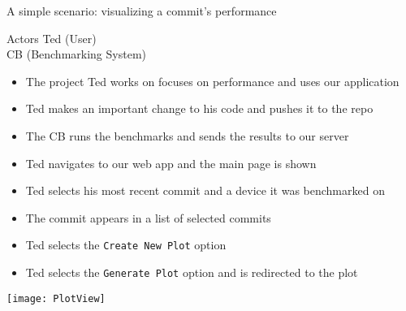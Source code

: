 \begin{frame}{A simple scenario: visualizing a commit's performance}
  \begin{block}{Actors}
    Ted (User)\\
    CB (Benchmarking System)
  \end{block}
  \begin{itemize}
    \item The project Ted works on focuses on performance and uses our application
    \item Ted makes an important change to his code and pushes it to the repo
    \item The CB runs the benchmarks and sends the results to our server
    \item Ted navigates to our web app and the main page is shown
    \item Ted selects his most recent commit and a device it was benchmarked on
    \item The commit appears in a list of selected commits
    \item Ted selects the \texttt{Create New Plot} option
    \item Ted selects the \texttt{Generate Plot} option and is redirected to the plot
  \end{itemize}
\end{frame}

\begin{frame}
  \texttt{[image: PlotView]}
\end{frame}
